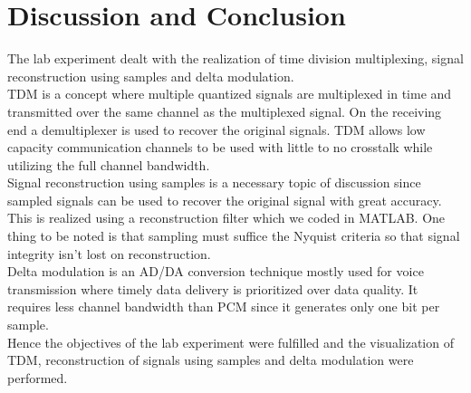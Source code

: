 \documentclass{lab_sheet}
\begin{document}
\section{Discussion and Conclusion}
The lab experiment dealt with the realization of time division multiplexing, signal reconstruction using samples and delta modulation.\\
TDM is a concept where multiple quantized signals are multiplexed in time and transmitted over the same channel as the multiplexed signal. On the receiving end a demultiplexer is used to recover the original signals. TDM allows low capacity communication channels to be used with little to no crosstalk while utilizing the full channel bandwidth.\\
Signal reconstruction using samples is a necessary topic of discussion since sampled signals can be used to recover the original signal with great accuracy. This is realized using a reconstruction filter which we coded in MATLAB. One thing to be noted is that sampling must suffice the Nyquist criteria so that signal integrity isn't lost on reconstruction.\\
Delta modulation is an AD/DA conversion technique mostly used for voice transmission where timely data delivery is prioritized over data quality. It requires less channel bandwidth than PCM since it generates only one bit per sample.\\
Hence the objectives of the lab experiment were fulfilled and the visualization of TDM, reconstruction of signals using samples and delta modulation were performed.
\end{document}
